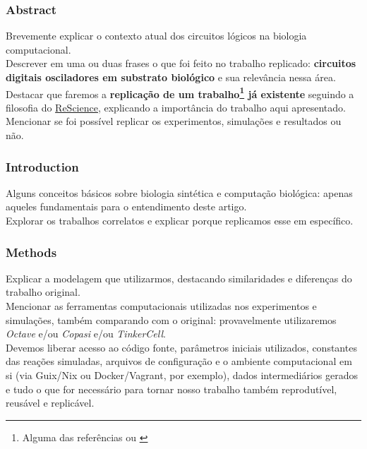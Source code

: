 
\subsubsection{Abstract}

Brevemente explicar o contexto atual dos circuitos lógicos na biologia computacional.\\
Descrever em uma ou duas frases o que foi feito no trabalho replicado: \textbf{circuitos digitais osciladores em substrato biológico} e sua relevância nessa área.\\
Destacar que faremos a \textbf{replicação de um trabalho\footnote{Alguma das referências \cite{oscillator} ou \cite{clock}} já existente} seguindo a filosofia do \href{http://rescience.github.io/}{ReScience}, explicando a importância do trabalho aqui apresentado.\\
Mencionar se foi possível replicar os experimentos, simulações e resultados ou não.\\


\subsubsection{Introduction}

Alguns conceitos básicos sobre biologia sintética e computação biológica: apenas aqueles fundamentais para o entendimento deste artigo.\\
Explorar os trabalhos correlatos e explicar porque replicamos esse em específico.\\


\subsubsection{Methods}

Explicar a modelagem que utilizarmos, destacando similaridades e diferenças do trabalho original.\\
Mencionar as ferramentas computacionais utilizadas nos experimentos e simulações, também comparando com o original: provavelmente utilizaremos \textit{Octave} e/ou \textit{Copasi} e/ou \textit{TinkerCell}.\\
Devemos liberar acesso ao código fonte, parâmetros iniciais utilizados, constantes das reações simuladas, arquivos de configuração e o ambiente computacional em si (via Guix/Nix ou Docker/Vagrant, por exemplo), dados intermediários gerados e tudo o que for necessário para tornar nosso trabalho também reprodutível, reusável e replicável.\\


